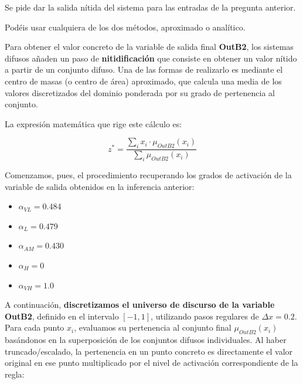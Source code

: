 \documentclass[11pt, a4paper]{article}
\newenvironment{problem}[1][Cuestión]{
	\vspace{0.5cm}
	\noindent{\Large\bfseries #1} \par\vspace{0.5cm}
}{
	\vspace{0.5cm}
}
\begin{document}
	\begin{problem}[Cuestión 3 (20 \%)]
		Se pide dar la salida nítida del sistema para las entradas de la pregunta anterior.

		Podéis usar cualquiera de los dos métodos, aproximado o analítico.

		{ \color{blue} 
			Para obtener el valor concreto de la variable de salida final \textbf{OutB2}, los sistemas difusos añaden un paso de \textbf{nitidificación} que consiste en obtener un valor nítido a partir de un conjunto difuso. Una de las formas de realizarlo es mediante el centro de masas (o centro de área) aproximado, que calcula una media de los valores discretizados del dominio ponderada por su grado de pertenencia al conjunto.

			La expresión matemática que rige este cálculo es:

			\[
			z^* = \frac{\sum_{i} x_i \cdot \mu_{OutB2}(x_i)}{\sum_{i} \mu_{OutB2}(x_i)}
			\]

			Comenzamos, pues, el procedimiento recuperando los grados de activación de la variable de salida obtenidos en la inferencia anterior:

			\begin{itemize}
				\item $\alpha_{VL} = 0.484$
				\item $\alpha_{L} = 0.479$
				\item $\alpha_{AM} = 0.430$
				\item $\alpha_{H} = 0$
				\item $\alpha_{VH} = 1.0$
			\end{itemize}

			A continuación, \textbf{discretizamos el universo de discurso de la variable \textbf{OutB2}}, definido en el intervalo $[-1, 1]$, utilizando pasos regulares de $\Delta x = 0.2$. Para cada punto $x_i$, evaluamos su pertenencia al conjunto final $\mu_{OutB2}(x_i)$ basándonos en la superposición de los conjuntos difusos individuales. Al haber truncado/escalado, la pertenencia en un punto concreto es directamente el valor original en ese punto multiplicado por el nivel de activación correspondiente de la regla:

}
\end{problem}
\end{document}
